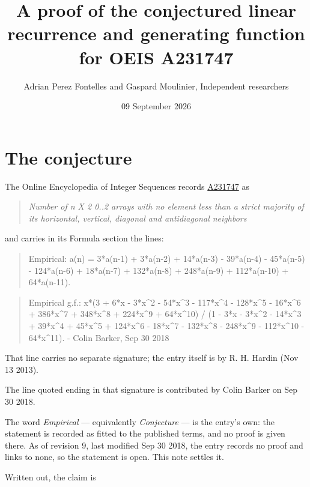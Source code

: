 \documentclass[11pt]{article}
\title{A proof of the conjectured linear recurrence and generating function for OEIS A231747}
\author{Adrian Perez Fontelles and Gaspard Moulinier, Independent researchers}
\date{09 September 2026}
\theoremstyle{definition}
\begin{document}
\maketitle
\section{The conjecture}

The Online Encyclopedia of Integer Sequences records \href{https://oeis.org/A231747}{A231747} as

\begin{quote}\itshape Number of n X 2 0..2 arrays with no element less than a strict majority of its horizontal, vertical, diagonal and antidiagonal neighbors\end{quote}

and carries in its Formula section the lines:

\begin{quote}\ttfamily Empirical: a(n) = 3*a(n-1) + 3*a(n-2) + 14*a(n-3) - 39*a(n-4) - 45*a(n-5) - 124*a(n-6) + 18*a(n-7) + 132*a(n-8) + 248*a(n-9) + 112*a(n-10) + 64*a(n-11).\end{quote}

\begin{quote}\ttfamily Empirical g.f.: x*(3 + 6*x - 3*x\textasciicircum{}2 - 54*x\textasciicircum{}3 - 117*x\textasciicircum{}4 - 128*x\textasciicircum{}5 - 16*x\textasciicircum{}6 + 386*x\textasciicircum{}7 + 348*x\textasciicircum{}8 + 224*x\textasciicircum{}9 + 64*x\textasciicircum{}10) / (1 - 3*x - 3*x\textasciicircum{}2 - 14*x\textasciicircum{}3 + 39*x\textasciicircum{}4 + 45*x\textasciicircum{}5 + 124*x\textasciicircum{}6 - 18*x\textasciicircum{}7 - 132*x\textasciicircum{}8 - 248*x\textasciicircum{}9 - 112*x\textasciicircum{}10 - 64*x\textasciicircum{}11). - Colin Barker, Sep 30 2018\end{quote}

That line carries no separate signature; the entry itself is by R. H. Hardin (Nov 13 2013).

The line quoted ending in that signature is contributed by Colin Barker on Sep 30 2018.

The word {\itshape Empirical} --- equivalently {\itshape Conjecture} --- is the entry's own: the statement is recorded as fitted to the published terms, and no proof is given there. As of revision 9, last modified Sep 30 2018, the entry records no proof and links to none, so the statement is open. This note settles it.

Written out, the claim is
\end{document}
